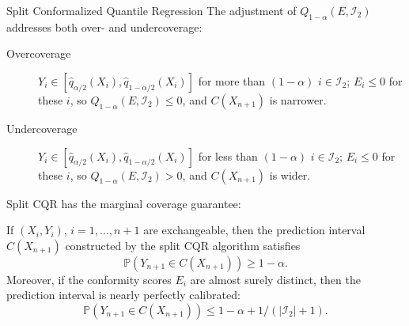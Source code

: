 \documentclass{beamer}
\newcommand{\Prob}{\mathbb{P}}
\begin{document}
\begin{frame}[allowframebreaks]{Split Conformalized Quantile Regression}
    The adjustment of $Q_{1 - \alpha}(E, \mathcal{I}_2)$ addresses both over- and undercoverage:
    \begin{description}
        \item[Overcoverage] $Y_i \in [\widehat{q}_{\alpha / 2}(X_i), \widehat{q}_{1 - \alpha / 2}(X_i)]$ for more than $(1 - \alpha)$ $i \in \mathcal{I}_2$; $E_i \le 0$ for these $i$, so $Q_{1 - \alpha}(E, \mathcal{I}_2) \le 0$, and $C(X_{n + 1})$ is narrower.
        \item[Undercoverage] $Y_i \in [\widehat{q}_{\alpha / 2}(X_i), \widehat{q}_{1 - \alpha / 2}(X_i)]$ for less than $(1 - \alpha)$ $i \in \mathcal{I}_2$; $E_i \le 0$ for these $i$, so $Q_{1 - \alpha}(E, \mathcal{I}_2) > 0$, and $C(X_{n + 1})$ is wider.
    \end{description}

    \framebreak

    Split CQR has the marginal coverage guarantee:
    \begin{theorem}
        If $(X_i, Y_i)$, $i = 1, \ldots, n + 1$ are exchangeable, then the prediction interval $C(X_{n + 1})$ constructed by the split CQR algorithm satisfies
        \[
        \Prob(Y_{n + 1} \in C(X_{n + 1})) \ge 1 - \alpha.
        \]
        Moreover, if the conformity scores $E_i$ are almost surely distinct, then the prediction interval is nearly perfectly calibrated:
        \[
        \Prob(Y_{n + 1} \in C(X_{n + 1})) \le 1 - \alpha + 1/(|\mathcal{I}_2| + 1).
        \]
    \end{theorem}
\end{frame}
\end{document}
